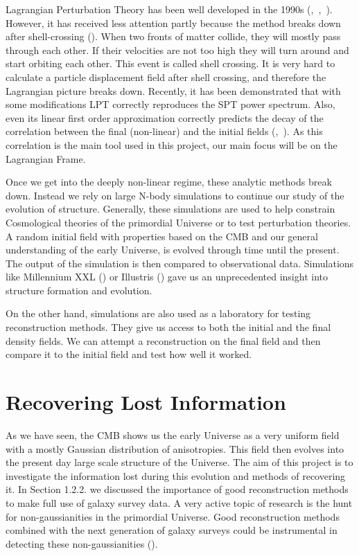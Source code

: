 Lagrangian Perturbation Theory has been well developed in the 1990s (\cite{1992MNRAS.254..729B},~\cite{1993MNRAS.264..375B},~\cite{1994MNRAS.267..811B}). However, it has received less attention partly because the method breaks down after shell-crossing (\cite{Carlson_perturbation_theory}).
When two fronts of matter collide, they will mostly pass through each other. If their velocities are not too high they will turn around and start orbiting each other. This event is called shell crossing. It is very hard to calculate a particle displacement field after shell crossing, and therefore the Lagrangian picture breaks down. Recently, it has been demonstrated that with some modifications LPT correctly reproduces the SPT power spectrum. Also, even its linear first order approximation correctly predicts the decay of the correlation between the final (non-linear) and the initial fields (\cite{2008PhRvD..77f3530M},~\cite{2008PhRvD..78h3519M}). As this correlation is the main tool used in this project, our main focus will be on the Lagrangian Frame. 

Once we get into the deeply non-linear regime, these analytic methods break down. Instead we rely on large N-body simulations to continue our study of the evolution of structure. Generally, these simulations are used to help constrain Cosmological theories of the primordial Universe or to test perturbation theories. A random initial field with properties based on the CMB and our general understanding of the early Universe, is evolved through time until the present. The output of the simulation is then compared to observational data. Simulations like Millennium XXL (\cite{Millennium_XXL}) or Illustris (\cite{Illustris_sim}) gave us an unprecedented insight into structure formation and evolution.

On the other hand, simulations are also used as a laboratory for testing reconstruction methods. They give us access to both the initial and the final density fields. We can attempt a reconstruction on the final field and then compare it to the initial field and test how well it worked. 

\section{Recovering Lost Information}

As we have seen, the CMB shows us the early Universe as a very uniform field with a mostly Gaussian distribution of anisotropies. This field then evolves into the present day large scale structure of the Universe. The aim of this project is to investigate the information lost during this evolution and methods of recovering it. In Section 1.2.2. we discussed the importance of good reconstruction methods to make full use of galaxy survey data. A very active topic of research is the hunt for non-gaussianities in the primordial Universe. Good reconstruction methods combined with the next generation of galaxy surveys could be instrumental in detecting these non-gaussianities (\cite{2004PhR...402..103B}).

